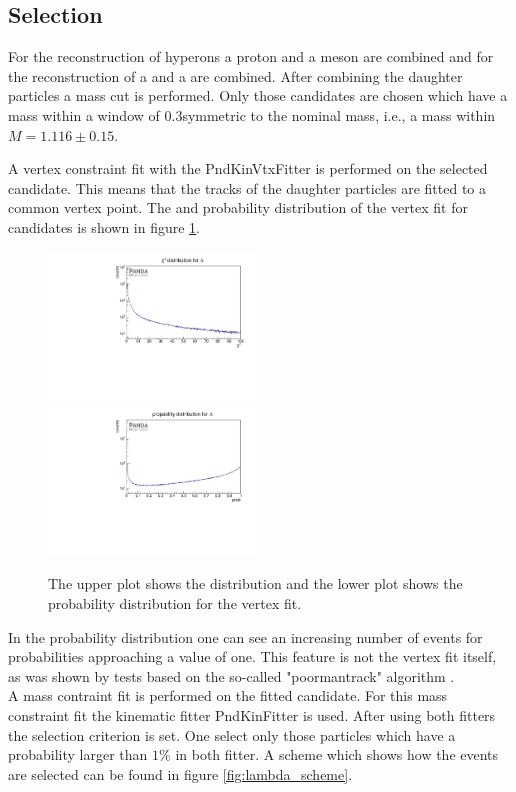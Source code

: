 	\subsection*{Selection}
		For the reconstruction of \lam hyperons a proton and a \piminus meson are combined and for the reconstruction 
		of \alam a \antiproton and a \piplus are combined.		 
		After combining the daughter particles a mass cut is performed.
		Only those candidates are chosen which have a mass within a window of $0.3$\massunit symmetric to the nominal 
		\lam mass, i.e., a mass within $M= 1.116\pm 0.15$\massunit.
		
		
		A vertex constraint fit with the PndKinVtxFitter is performed on the selected candidate.
		This means that the tracks of the daughter particles are fitted to a common vertex point.  
		The \chisq and probability distribution of the vertex fit for \lam candidates is shown in figure \ref{fig:lambda_chi2}.
		
		\begin{figure}
			\centering
				\includegraphics[width=0.50\textwidth]{./plots/lambda0/lambda0_chi2.pdf}
				\includegraphics [width=0.50\textwidth]{./plots/lambda0/lambda0_prob.pdf}
			\caption{\propose The upper plot shows the  \chisq distribution and the lower plot shows the probability distribution for the \lam vertex fit.}
			\label{fig:lambda_chi2}
		\end{figure}
		
		In the probability distribution one can see an increasing number of events for probabilities approaching a value of one.
		This feature is not the vertex fit itself, as was shown by tests based on the so-called "poormantrack" algorithm \cite{RalfKliemt}.
		\vspace{11pt}\\
		A mass contraint fit is performed on the fitted candidate.
		For this mass constraint fit the kinematic fitter PndKinFitter is used.
		After using both fitters the selection criterion is set. 
		One select only those particles which have a probability larger than $1\%$ in both fitter.
		A scheme which shows how the events are selected can be found in figure \ref{fig:lambda_scheme}. 
		
